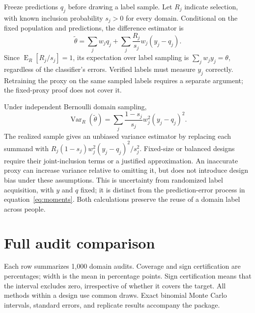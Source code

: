 \documentclass[11pt,letterpaper]{article}
\newcommand{\E}{\operatorname{E}}
\newcommand{\Var}{\operatorname{Var}}
\begin{document}
Freeze predictions $q_j$ before drawing a label sample. Let $R_j$ indicate
selection, with known inclusion probability $s_j>0$ for every domain. Conditional on the fixed population and predictions,
the difference estimator is
\begin{equation}\label{eq:difference}
 \widetilde\theta=\sum_j w_jq_j+
 \sum_j\frac{R_j}{s_j}w_j(y_j-q_j).
\end{equation}
Since $\E_R[R_j/s_j]=1$, its expectation over label sampling is
$\sum_jw_jy_j=\theta$, regardless of the classifier's errors. Verified labels
must measure $y_j$ correctly. Retraining the proxy on the same sampled labels
requires a separate argument; the fixed-proxy proof does not cover it.

Under independent Bernoulli domain sampling,
\begin{equation}\label{eq:designvariance}
 \Var_R(\widetilde\theta)=
 \sum_j\frac{1-s_j}{s_j}w_j^2(y_j-q_j)^2.
\end{equation}
The realized sample gives an unbiased variance estimator by replacing each
summand with $R_j(1-s_j)w_j^2(y_j-q_j)^2/s_j^2$.
Fixed-size or balanced designs require their joint-inclusion terms or a
justified approximation. An inaccurate proxy can increase variance relative
to omitting it, but does not introduce design bias under these assumptions.
This is uncertainty from randomized label acquisition, with $y$ and $q$ fixed;
it is distinct from the prediction-error process in equation~\eqref{eq:moments}.
Both calculations preserve the reuse of a domain label across people.


\section{Full audit comparison}\label{app:audit}
\begin{table}[htbp]
\centering\small
\caption{All audit designs and methods for the prespecified coefficient}

\par\smallskip
\begin{minipage}{\linewidth}\footnotesize
Each row summarizes 1,000 domain audits. Coverage and sign certification are
percentages; width is the mean in percentage points. Sign certification means
that the interval excludes zero, irrespective of whether it covers the target.
All methods within a design use common draws. Exact binomial Monte Carlo
intervals, standard errors, and replicate results accompany the package.
\end{minipage}
\end{table}
\end{document}
